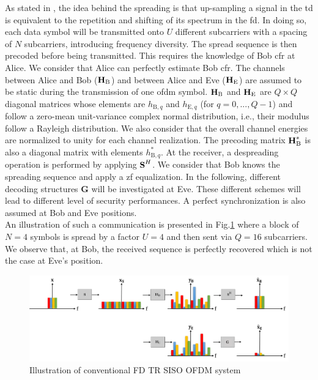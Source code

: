 As stated in \cite{TR_FD_TD}, the idea behind the spreading is that up-sampling a signal in the \gls{td} is equivalent to the repetition and shifting of its spectrum in the \gls{fd}. In doing so, each data symbol will be transmitted onto $U$ different subcarriers with a spacing of $N$ subcarriers, introducing frequency diversity. The spread sequence is then precoded before being transmitted. This requires the knowledge of Bob \gls{cfr} at Alice. We consider that Alice can perfectly estimate Bob \gls{cfr}. The channels between Alice and Bob ($\textbf{H}_{\text{B}}$) and between Alice and Eve ($\textbf{H}_{\text{E}}$) are assumed to be static during the transmission of one \gls{ofdm} symbol. $\textbf{H}_{\text{B}}$ and $\textbf{H}_{\text{E}}$ are $Q\times Q$ diagonal matrices whose elements are $h_{\text{B},q}$ and $h_{\text{E},q}$ (for $q = 0,...,Q-1$) and follow a zero-mean unit-variance complex normal distribution, i.e., their modulus follow a Rayleigh distribution. We also consider that the overall channel energies are normalized to unity for each channel realization. The precoding matrix $\textbf{H}_{\text{B}}^*$ is also a diagonal matrix with elements $h_{\text{B},q}^*$. At the receiver, a despreading operation is performed by applying $\textbf{S}^H$. We consider that Bob knows the spreading sequence and apply a \gls{zf} equalization.  In the following, different decoding structures $\textbf{G}$ will be investigated at Eve. These different schemes will lead to different level of security performances. A perfect synchronization is also assumed at Bob and Eve positions.\\

An illustration of such a communication is presented in Fig.\ref{fig:no_AN_illustration} where a block of $N=4$ symbols is spread by a factor $U=4$ and then sent via $Q=16$ subcarriers. We observe that, at Bob, the received sequence is perfectly recovered which is not the case at Eve's position. 
\begin{figure}[h!]
    \centering
    \includegraphics[width=1\linewidth]{img/scheme_no_AN_illustration.png}
    \caption{Illustration of conventional FD TR SISO OFDM system}
    \label{fig:no_AN_illustration}
\end{figure} 






